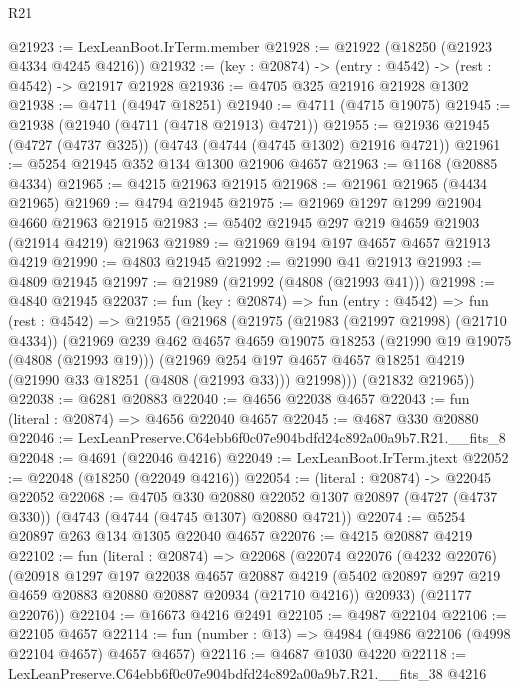 \begin{lexlean}{R21}
\begin{coremodule}
@21923 := LexLeanBoot.IrTerm.member
@21928 := @21922 (@18250 (@21923 @4334 @4245 @4216))
@21932 := (key : @20874) -> (entry : @4542) -> (rest : @4542) -> @21917 @21928
@21936 := @4705 @325 @21916 @21928 @1302
@21938 := @4711 (@4947 @18251)
@21940 := @4711 (@4715 @19075)
@21945 := @21938 (@21940 (@4711 (@4718 @21913) @4721))
@21955 := @21936 @21945 (@4727 (@4737 @325)) (@4743 (@4744 (@4745 @1302) @21916 @4721))
@21961 := @5254 @21945 @352 @134 @1300 @21906 @4657
@21963 := @1168 (@20885 @4334)
@21965 := @4215 @21963 @21915
@21968 := @21961 @21965 (@4434 @21965)
@21969 := @4794 @21945
@21975 := @21969 @1297 @1299 @21904 @4660 @21963 @21915
@21983 := @5402 @21945 @297 @219 @4659 @21903 (@21914 @4219) @21963
@21989 := @21969 @194 @197 @4657 @4657 @21913 @4219
@21990 := @4803 @21945
@21992 := @21990 @41 @21913
@21993 := @4809 @21945
@21997 := @21989 (@21992 (@4808 (@21993 @41)))
@21998 := @4840 @21945
@22037 := fun (key : @20874) =>
  fun (entry : @4542) =>
  fun (rest : @4542) =>
  @21955
    (@21968
      (@21975
        (@21983 (@21997 @21998) (@21710 @4334))
        (@21969
          @239
          @462
          @4657
          @4659
          @19075
          @18253
          (@21990 @19 @19075 (@4808 (@21993 @19)))
          (@21969
            @254
            @197
            @4657
            @4657
            @18251
            @4219
            (@21990 @33 @18251 (@4808 (@21993 @33)))
            @21998)))
      (@21832 @21965))
@22038 := @6281 @20883
@22040 := @4656 @22038 @4657
@22043 := fun (literal : @20874) => @4656 @22040 @4657
@22045 := @4687 @330 @20880
@22046 := LexLeanPreserve.C64ebb6f0c07e904bdfd24c892a00a9b7.R21.__fits_8
@22048 := @4691 (@22046 @4216)
@22049 := LexLeanBoot.IrTerm.jtext
@22052 := @22048 (@18250 (@22049 @4216))
@22054 := (literal : @20874) -> @22045 @22052
@22068 := @4705
    @330
    @20880
    @22052
    @1307
    @20897
    (@4727 (@4737 @330))
    (@4743 (@4744 (@4745 @1307) @20880 @4721))
@22074 := @5254 @20897 @263 @134 @1305 @22040 @4657
@22076 := @4215 @20887 @4219
@22102 := fun (literal : @20874) =>
  @22068
    (@22074
      @22076
      (@4232 @22076)
      (@20918
        @1297
        @197
        @22038
        @4657
        @20887
        @4219
        (@5402 @20897 @297 @219 @4659 @20883 @20880 @20887 @20934 (@21710 @4216))
        @20933)
      (@21177 @22076))
@22104 := @16673 @4216 @2491
@22105 := @4987 @22104
@22106 := @22105 @4657
@22114 := fun (number : @13) => @4984 (@4986 @22106 (@4998 @22104 @4657) @4657 @4657)
@22116 := @4687 @1030 @4220
@22118 := LexLeanPreserve.C64ebb6f0c07e904bdfd24c892a00a9b7.R21.__fits_38 @4216

\end{coremodule}
\end{lexlean}
